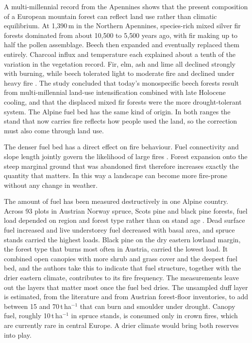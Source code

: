 \documentclass[11pt,a4paper]{article}
\begin{document}
A multi-millennial record from the Apennines shows that the present composition of a European mountain forest can reflect land use rather than climatic equilibrium. At 1{,}390\,m in the Northern Apennines, species-rich mixed silver fir forests dominated from about 10{,}500 to 5{,}500 years ago, with fir making up to half the pollen assemblage. Beech then expanded and eventually replaced them entirely. Charcoal influx and temperature each explained about a tenth of the variation in the vegetation record. Fir, elm, ash and lime all declined strongly with burning, while beech tolerated light to moderate fire and declined under heavy fire \citep{moralesmolino_longterm_2021}. The study concluded that today's monospecific beech forests result from multi-millennial land-use intensification combined with late Holocene cooling, and that the displaced mixed fir forests were the more drought-tolerant system. The Alpine fuel bed has the same kind of origin. In both ranges the stand that now carries fire reflects how people used the land, so the correction must also come through land use.

The denser fuel bed has a direct effect on fire behaviour. Fuel connectivity and slope length jointly govern the likelihood of large fires \citep{conedera_linking_2024}. Forest expansion onto the steep marginal ground that was abandoned first therefore increases exactly the quantity that matters. In this way a landscape can become more fire-prone without any change in weather.

The amount of fuel has been measured destructively in one Alpine country. Across 93 plots in Austrian Norway spruce, Scots pine and black pine forests, fuel load depended on region and forest type rather than on stand age \citep{neumann_fuel_2022}. Dead surface fuel increased and live understorey fuel decreased with basal area, and spruce stands carried the highest loads. Black pine on the dry eastern lowland margin, the forest type that burns most often in Austria, carried the lowest load. It combined open canopies with more shrub and grass cover and the deepest fuel bed, and the authors take this to indicate that fuel structure, together with the drier eastern climate, contributes to its fire frequency. The measurements leave out the layers that matter most once the fuel bed dries. The unsampled duff layer is estimated, from the literature and from Austrian forest-floor inventories, to add between 15 and 70\,t\,ha$^{-1}$ that can burn and smoulder under drought. Canopy fuel, roughly 10\,t\,ha$^{-1}$ in spruce stands, is consumed only in crown fires, which are currently rare in central Europe. A drier climate would bring both reserves into play.
\end{document}
